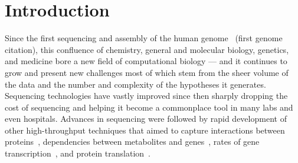 \documentclass[12pt]{cmuthesis}
\begin{document}
\tableofcontents
\listoffigures
\listoftables

\mainmatter


%
%
%
%
%



\chapter{Introduction}


Since the first sequencing and assembly of the human genome~\cite{FirstHumanGenome} (first genome citation), this confluence of chemistry, general and molecular biology, genetics, and medicine bore a new field of computational biology --- and it continues to grow and present new challenges most of which stem from the sheer volume of the data and the number and complexity of the hypotheses it generates. Sequencing technologies have vastly improved since then sharply dropping the cost of sequencing and helping it become a commonplace tool in many labs and even hospitals. Advances in sequencing were followed by rapid development of other high-throughput techniques that aimed to capture interactions between proteins~\cite{ppiNetworks}, dependencies between metabolites and genes~\cite{gene2geneNetworks}, rates of gene transcription~\cite{RNA-seqTechnology}, and protein translation~\cite{riboseq}.
\end{document}
